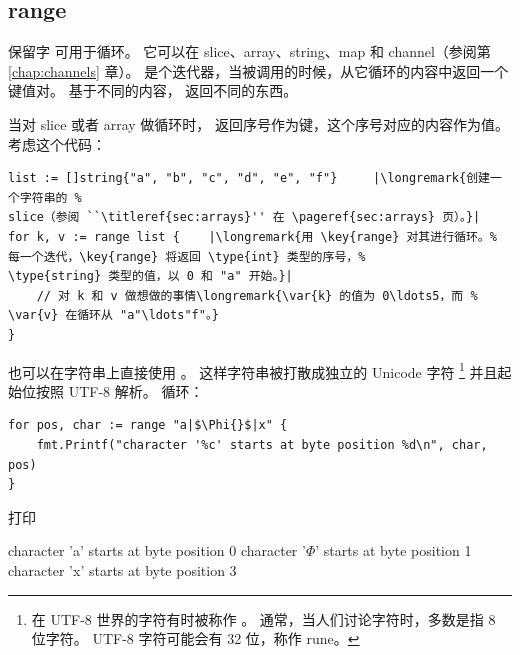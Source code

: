 \subsection{range}
保留字  可用于循环。
它可以在 slice、array、string、map 和 channel（参阅第 \ref{chap:channels} 章）。
 是个迭代器，当被调用的时候，从它循环的内容中返回一个键值对。
基于不同的内容， 返回不同的东西。

当对 slice 或者 array 做循环时， 返回序号作为键，这个序号对应的内容作为值。
考虑这个代码：
\begin{lstlisting}
list := []string{"a", "b", "c", "d", "e", "f"}     |\longremark{创建一个字符串的 %
slice（参阅 ``\titleref{sec:arrays}'' 在 \pageref{sec:arrays} 页）。}|
for k, v := range list {	|\longremark{用 \key{range} 对其进行循环。%
每一个迭代，\key{range} 将返回 \type{int} 类型的序号，%
\type{string} 类型的值，以 0 和 "a" 开始。}|
    // 对 k 和 v 做想做的事情\longremark{\var{k} 的值为 0\ldots5，而 %
\var{v} 在循环从 "a"\ldots"f"。}
}
\end{lstlisting}
\showremarks

也可以在字符串上直接使用 。
这样字符串被打散成独立的 Unicode 字符
\footnote{在 UTF-8 世界的字符有时被称作 。
通常，当人们讨论字符时，多数是指 8 位字符。
UTF-8 字符可能会有 32 位，称作 rune。}
并且起始位按照 UTF-8 解析。
循环：
\begin{lstlisting}
for pos, char := range "a|$\Phi{}$|x" {
    fmt.Printf("character '%c' starts at byte position %d\n", char, pos)
}
\end{lstlisting}
打印
\begin{display}
character 'a' starts at byte position 0
character '\begin{math}\Phi\end{math}' starts at byte position 1
character 'x' starts at byte position 3 
\end{display}

